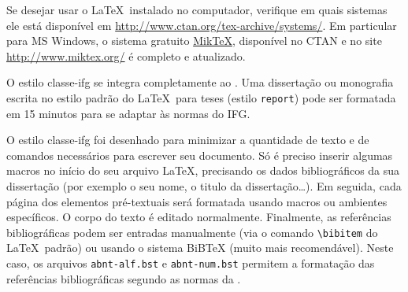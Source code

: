 Se desejar usar o \LaTeX\ instalado no computador, verifique em quais sistemas ele está disponível em \url{http://www.ctan.org/tex-archive/systems/}. Em particular para \textsf{MS Windows}, o sistema gratuito \href{http://www.miktex.org/}{MikTeX}, disponível no CTAN e no site \url{http://www.miktex.org/} é completo e atualizado.

O estilo \textsf{classe-ifg} se integra completamente ao \LaTeXe. Uma dissertação ou monografia escrita no estilo padrão do \LaTeX\ para teses (estilo \verb|report|) pode ser formatada em 15 minutos para se adaptar às normas do IFG.

O estilo \textsf{classe-ifg} foi desenhado para minimizar a quantidade de texto e de comandos necessários para escrever seu documento. Só é preciso inserir algumas macros no início do seu arquivo \LaTeX, precisando os dados bibliográficos da sua dissertação (por exemplo o seu nome, o titulo da dissertação\ldots). Em seguida, cada página dos elementos pré-textuais será formatada usando macros ou ambientes específicos. O corpo do texto é editado normalmente. Finalmente, as referências bibliográficas podem ser entradas manualmente (via o comando \verb|\bibitem| do \LaTeX\ padrão) ou usando o sistema BiBTeX (muito mais recomendável). Neste caso, os arquivos \verb|abnt-alf.bst| e \verb|abnt-num.bst| permitem a formatação das referências bibliográficas segundo as normas da .

